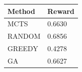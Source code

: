 \begin{tabular}{ll}
\hline
Method & Reward \\
\hline
  MCTS & 0.6630 \\
  RANDOM & 0.6856 \\
  GREEDY & 0.4278 \\
  GA & 0.6627 \\
\hline
\end{tabular}
